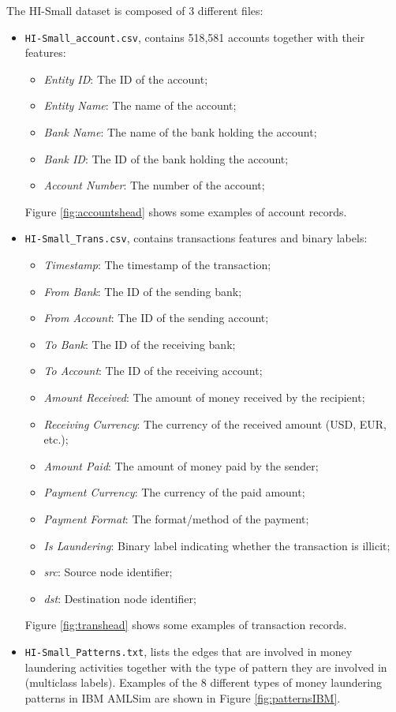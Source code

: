 The HI-Small dataset is composed of 3 different files:
\begin{itemize}
    \item \texttt{HI-Small\_account.csv}, contains 518,581 accounts together with their features:
    \begin{itemize}
        \item \textit{Entity ID}: The ID of the account;
        \item \textit{Entity Name}: The name of the account;
        \item \textit{Bank Name}: The name of the bank holding the account; 
        \item \textit{Bank ID}: The ID of the bank holding the account;
        \item \textit{Account Number}: The number of the account;    
    \end{itemize}
    Figure \ref{fig:accountshead} shows some examples of account records.
    \item \texttt{HI-Small\_Trans.csv}, contains transactions features and binary labels:
    \begin{itemize}
        \item \textit{Timestamp}: The timestamp of the transaction;
        \item \textit{From Bank}: The ID of the sending bank;
        \item \textit{From Account}: The ID of the sending account;
        \item \textit{To Bank}: The ID of the receiving bank;
        \item \textit{To Account}: The ID of the receiving account;
        \item \textit{Amount Received}: The amount of money received by the recipient;
        \item \textit{Receiving Currency}: The currency of the received amount (USD, EUR, etc.);
        \item \textit{Amount Paid}: The amount of money paid by the sender;
        \item \textit{Payment Currency}: The currency of the paid amount;
        \item \textit{Payment Format}: The format/method of the payment;
        \item \textit{Is Laundering}: Binary label indicating whether the transaction is illicit;
        \item \textit{src}: Source node identifier;
        \item \textit{dst}: Destination node identifier;
    \end{itemize}
    Figure \ref{fig:transhead} shows some examples of transaction records.
    \item \texttt{HI-Small\_Patterns.txt}, lists the edges that are involved in money laundering activities together with the type of pattern they are involved in (multiclass labels).
    Examples of the 8 different types of money laundering patterns in IBM AMLSim are shown in Figure \ref{fig:patternsIBM}.
\end{itemize}
